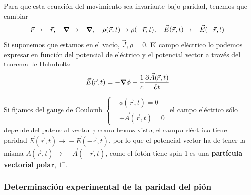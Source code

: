 Para que esta ecuación del movimiento sea invariante bajo paridad, tenemos que cambiar$$\vec{r}\xrightarrow[]{}-\vec{r}, \quad \grad \xrightarrow[]{} -\grad, \quad \rho(\vec{r},t) \xrightarrow[]{} \rho(-\vec{r},t), \quad \vec{E}(\vec{r},t) \xrightarrow[]{} -\vec{E}(-\vec{r},t)$$
Si suponemos que estamos en el vacío, $\vec{J},\rho=0$.
El campo eléctrico lo podemos expresar en función del potencial de eléctrico y el potencial vector a través del teorema de Helmholtz
\begin{equation}
    \vec{E}(\vec{r},t)=-\grad \phi -\frac{1}{c} \pdv{\vec{A}(\vec{r},t)}{t}
    \label{eq: campo electrico y potenciales}
\end{equation}

Si fijamos del gauge de Coulomb $\displaystyle \left \{ \begin{aligned}
&\phi(\vec{r},t)=0\\
& \div \vec{A}(\vec{r},t)=0
\end{aligned}\right.$ el campo eléctrico sólo depende del potencial vector y como hemos visto, el campo eléctrico tiene paridad $\vec{E}(\vec{r},t) \xrightarrow[]{} -\vec{E}(-\vec{r},t)$, por lo que el potencial vector ha de tener la misma $\vec{A}(\vec{r},t) \xrightarrow[]{} -\vec{A}(-\vec{r},t)$, como el fotón tiene spin 1 es una \textbf{partícula vectorial polar}, $1^-$.

\subsubsection{Determinación experimental de la paridad del pión}

